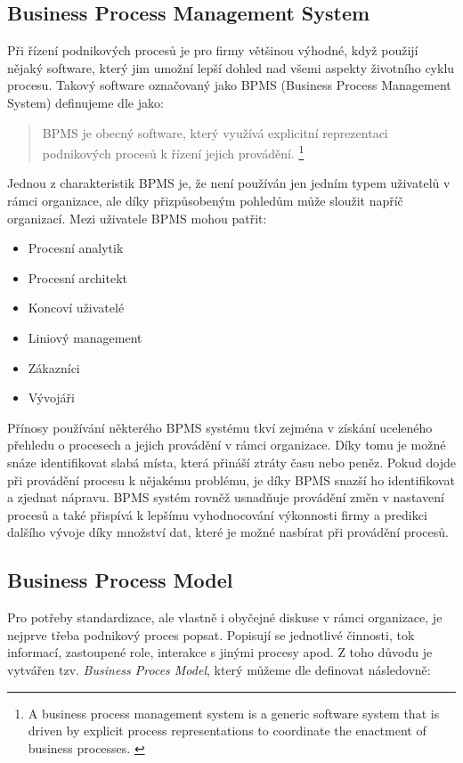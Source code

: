 \subsection{Business Process Management System}
Při řízení podnikových procesů je pro firmy většinou výhodné, když použijí nějaký software, který jim umožní lepší dohled nad všemi aspekty životního cyklu procesu. Takový software označovaný jako BPMS (Business Process Management System) definujeme dle \cite{Weske2007} jako:

\begin{quote}
BPMS je obecný software, který využívá explicitní reprezentaci podnikových procesů k řízení jejich provádění.
\footnote{A business process management system is a generic software system that is driven by explicit process representations to coordinate the enactment of business processes. \cite{Weske2007}}
\end{quote}

Jednou z charakteristik BPMS je, že není používán jen jedním typem uživatelů v rámci organizace, ale díky přizpůsobeným pohledům může sloužit napříč organizací. Mezi uživatele BPMS mohou patřit: \cite{Naplava2015}

\begin{itemize}
\item Procesní analytik
\item Procesní architekt
\item Koncoví uživatelé
\item Liniový management
\item Zákazníci
\item Vývojáři
\end{itemize}

Přínosy používání některého BPMS systému tkví zejména v získání uceleného přehledu o procesech a jejich provádění v rámci organizace. Díky tomu je možné snáze identifikovat slabá místa, která přináší ztráty času nebo peněz. Pokud dojde při provádění procesu k nějakému problému, je díky BPMS snazší ho identifikovat a zjednat nápravu. BPMS systém rovněž usnadňuje provádění změn v nastavení procesů a také přispívá k lepšímu vyhodnocování výkonnosti firmy a predikci dalšího vývoje díky množství dat, které je možné nasbírat při provádění procesů.

\subsection{Business Process Model}
Pro potřeby standardizace, ale vlastně i obyčejné diskuse v rámci organizace, je nejprve třeba podnikový proces popsat. Popisují se jednotlivé činnosti, tok informací, zastoupené role, interakce s jinými procesy apod. Z toho důvodu je vytvářen tzv. \textit{Business Proces Model}, který můžeme dle \cite{Weske2007} definovat následovně:

